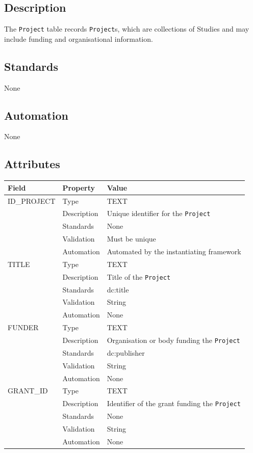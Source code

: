 \documentclass[
]{article}
\newcounter{none}
\begin{document}
\subsection{Description}\label{description-25}

The \texttt{Project} table records \texttt{Project}s, which are
collections of Studies and may include funding and organisational
information.

\subsection{Standards}\label{standards-27}

None

\subsection{Automation}\label{automation-27}

None

\subsection{Attributes}\label{attributes-24}

{\def\LTcaptype{none} 
\begin{longtable}[]{@{}lll@{}}
\toprule\noalign{}
Field & Property & Value \\
\midrule\noalign{}
\endhead
\bottomrule\noalign{}
\endlastfoot
ID\_PROJECT & Type & TEXT \\
& Description & Unique identifier for the \texttt{Project} \\
& Standards & None \\
& Validation & Must be unique \\
& Automation & Automated by the instantiating framework \\
TITLE & Type & TEXT \\
& Description & Title of the \texttt{Project} \\
& Standards & dc:title \\
& Validation & String \\
& Automation & None \\
FUNDER & Type & TEXT \\
& Description & Organisation or body funding the \texttt{Project} \\
& Standards & dc:publisher \\
& Validation & String \\
& Automation & None \\
GRANT\_ID & Type & TEXT \\
& Description & Identifier of the grant funding the \texttt{Project} \\
& Standards & None \\
& Validation & String \\
& Automation & None \\
\end{longtable}
}
\end{document}
